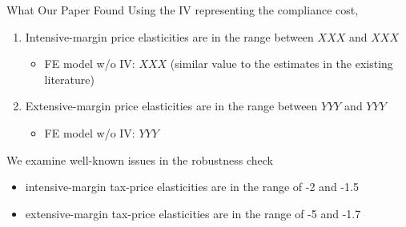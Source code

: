 \documentclass[
  ignorenonframetext,
  aspectratio=169,
]{beamer}
\providecommand{\tightlist}{%
  \setlength{\itemsep}{0pt}\setlength{\parskip}{0pt}}
\begin{document}
\begin{frame}{What Our Paper Found}
\protect\hypertarget{what-our-paper-found}{}
Using the IV representing the compliance cost,

\begin{enumerate}
\tightlist
\item
  Intensive-margin price elasticities are in the range between \(XXX\) and \(XXX\)

  \begin{itemize}
  \tightlist
  \item
    FE model w/o IV: \(XXX\) (similar value to the estimates in the existing literature)
  \end{itemize}
\item
  Extensive-margin price elasticities are in the range between \(YYY\) and \(YYY\)

  \begin{itemize}
  \tightlist
  \item
    FE model w/o IV: \(YYY\)
  \end{itemize}
\end{enumerate}

We examine well-known issues in the robustness check

\begin{itemize}
\tightlist
\item
  intensive-margin tax-price elasticities are in the range of -2 and -1.5
\item
  extensive-margin tax-price elasticities are in the range of -5 and -1.7
\end{itemize}
\end{frame}
\end{document}
